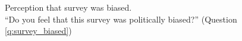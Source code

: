 \documentclass[12pt,english]{article}
\begin{document}
\begin{figure}[h!] 
    \caption[Perception that survey was biased]{Perception that survey was biased. \\ ``Do you feel that this survey was politically biased?'' (Question \ref{q:survey_biased})}\label{fig:survey_biased}
\end{figure}
\end{document}
